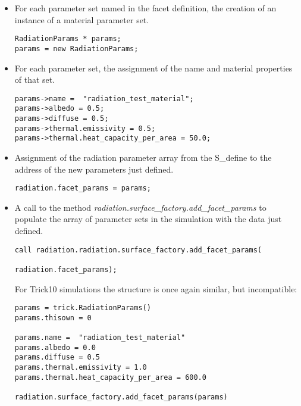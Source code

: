 \begin{itemize}
\item{} For each parameter set named in the facet definition, the creation of an instance of a material parameter set.
\begin{verbatim}
RadiationParams * params;
params = new RadiationParams;
\end{verbatim}

\item{} For each parameter set, the assignment of the name and material properties of that set.
\begin{verbatim}
params->name =  "radiation_test_material";
params->albedo = 0.5;
params->diffuse = 0.5;
params->thermal.emissivity = 0.5;
params->thermal.heat_capacity_per_area = 50.0;
\end{verbatim}

\item{} Assignment of the radiation parameter array from the S\_define to the address of the new parameters just defined.
\begin{verbatim}
radiation.facet_params = params;
\end{verbatim}

\item{} A call to the method \textit{radiation.surface\_factory.add\_facet\_params} to populate the array of parameter sets in the simulation with the data just defined.
\begin{verbatim}
call radiation.radiation.surface_factory.add_facet_params(
                                                     radiation.facet_params);
\end{verbatim}


For Trick10 simulations the structure is once again similar, but incompatible:
\begin{verbatim}
params = trick.RadiationParams()
params.thisown = 0

params.name =  "radiation_test_material"
params.albedo = 0.0
params.diffuse = 0.5
params.thermal.emissivity = 1.0
params.thermal.heat_capacity_per_area = 600.0

radiation.surface_factory.add_facet_params(params)
\end{verbatim}
\end{itemize}
